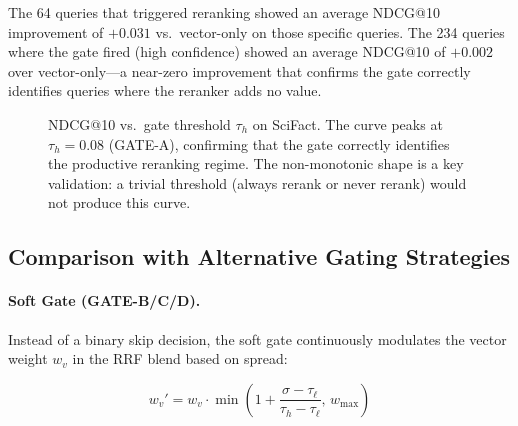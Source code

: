 \documentclass[11pt]{article}
\begin{document}
The 64 queries that triggered reranking showed an average NDCG@10 improvement of
$+0.031$ vs.\ vector-only on those specific queries. The 234 queries where the gate
fired (high confidence) showed an average NDCG@10 of $+0.002$ over vector-only---a
near-zero improvement that confirms the gate correctly identifies queries where the
reranker adds no value.

\begin{figure}[H]
\centering
{}
\caption{NDCG@10 vs.\ gate threshold $\tau_h$ on SciFact. The curve peaks at
$\tau_h = 0.08$ (GATE-A), confirming that the gate correctly identifies the productive
reranking regime. The non-monotonic shape is a key validation: a trivial threshold
(always rerank or never rerank) would not produce this curve.}
\label{fig:gate-sensitivity}
\end{figure}

\subsection{Comparison with Alternative Gating Strategies}

\paragraph{Soft Gate (GATE-B/C/D).}
Instead of a binary skip decision, the soft gate continuously modulates the vector
weight $w_v$ in the RRF blend based on spread:

\begin{equation}
  w_v' = w_v \cdot \min\!\left(1 + \frac{\sigma - \tau_\ell}{\tau_h - \tau_\ell}, \, w_{\max}\right)
\end{equation}
\end{document}
